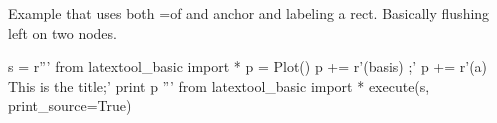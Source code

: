 \newpage
Example that uses both =of and anchor and labeling a rect.
Basically flushing left on two nodes.
\begin{python}
s = r'''
from latextool_basic import *
p = Plot()
p += r'\node[minimum width=5cm, draw, rectangle] (basis) {};'
p += r'\node[above=0.2cm of basis.north west, anchor=south west, rectangle, minimum width=1cm, inner sep=0cm] (a) {This is the title};'
print p
'''
from latextool_basic import *
execute(s, print_source=True)
\end{python}


\newpage

